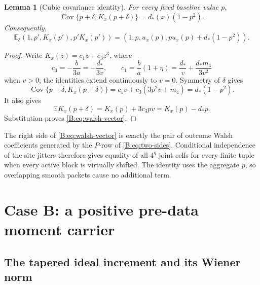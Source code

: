 \documentclass[11pt]{article}
\newtheorem{lemma}[lemma]{Lemma}
\newcommand{\E}{\mathbb{E}}
\begin{document}
\begin{lemma}[Cubic covariance identity]
\label{B:lem:cubic}
For every fixed baseline value \(p\),
\begin{equation}
 \operatorname{Cov}\{p+\delta,K_x(p+\delta)\}
 =d_*(x)(1-p^2).
 \label{B:eq:cubic-cov}
\end{equation}
Consequently,
\begin{equation}
 \E_\delta(1,p',K_x(p'),p'K_x(p'))
 =(1,p,u_x(p),pu_x(p)+d_*(1-p^2)).
 \label{B:eq:walsh-vector}
\end{equation}
\end{lemma}

\begin{proof}
Write \(K_x(z)=c_1z+c_3z^3\), where
\[
 c_3=-\frac b{3a}=-\frac{d_*}{3v},
 \qquad
 c_1=\frac ba(1+\eta)
     =\frac{d_*}{v}+\frac{d_*m_4}{3v^2}
\]
when \(v>0\); the identities extend continuously to \(v=0\).  Symmetry
of \(\delta\) gives
\[
 \operatorname{Cov}\{p+\delta,K_x(p+\delta)\}
 =c_1v+c_3(3p^2v+m_4)
 =d_*(1-p^2).
\]
It also gives
\[
 \E K_x(p+\delta)
 =K_x(p)+3c_3pv=K_x(p)-d_*p.
\]
Substitution proves \eqref{B:eq:walsh-vector}.
\end{proof}

The right side of \eqref{B:eq:walsh-vector} is exactly the pair of outcome
Walsh coefficients generated by the \(P\)-row of \eqref{B:eq:two-sides}.
Conditional independence of the site jitters therefore gives equality of all
\(4^q\) joint cells for every finite tuple when every active block is
virtually shifted.  The identity uses the aggregate \(p\), so overlapping
smooth packets cause no additional term.

\section{Case B: a positive pre-data moment carrier}

\subsection{The tapered ideal increment and its Wiener norm}
\end{document}
